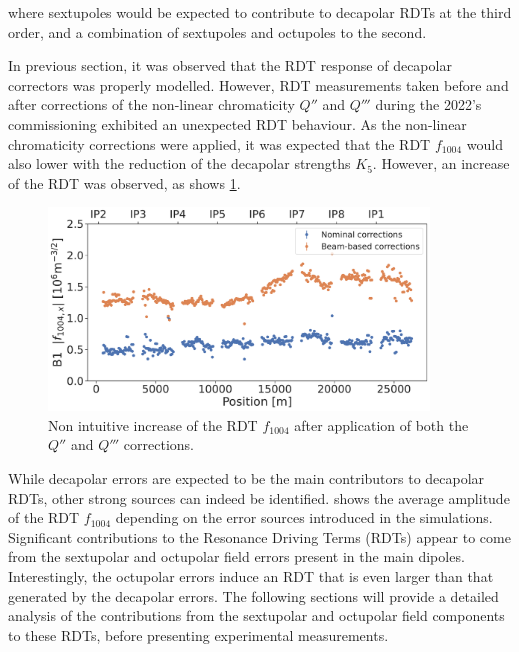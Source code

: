 where sextupoles would be expected to contribute to decapolar RDTs at the third order, and a
combination of sextupoles and octupoles to the second.

In previous section, it was observed that the RDT response of decapolar correctors was properly
modelled. However, RDT measurements taken before and after corrections of the non-linear
chromaticity $Q''$ and $Q'''$ during the 2022's commissioning exhibited an unexpected RDT behaviour.
As the non-linear chromaticity corrections were applied, it was expected that the RDT $f_{1004}$
would also lower with the reduction of the decapolar strengths $K_5$. However, an increase of the
RDT was observed, as shows \cref{fig:decapoles:f1004_dq2_dq3}.

\begin{figure}[!htb]
    \centering
    \includegraphics[width=0.9\textwidth]{./images/f1004_dq2_dq3_2022.pdf}    
    \caption{Non intuitive increase of the RDT $f_{1004}$ after application of both the $Q''$ and
    $Q'''$ corrections.}
    \label{fig:decapoles:f1004_dq2_dq3}
\end{figure}


While decapolar errors are expected to be the main contributors to decapolar RDTs, other strong
sources can indeed be identified.  shows the average
amplitude of the RDT $f_{1004}$ depending on the error sources introduced in the simulations. 
Significant contributions to the Resonance Driving Terms (RDTs) appear to come from the sextupolar
and octupolar field errors present in the main dipoles. Interestingly, the octupolar errors induce
an RDT that is even larger than that generated by the decapolar errors. 
The following sections will provide a detailed analysis of the contributions from the sextupolar and
octupolar field components to these RDTs, before presenting experimental measurements.

